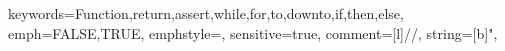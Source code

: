 {keywords={Function,return,assert,while,for,to,downto,if,then,else},%
emph={FALSE,TRUE},
emphstyle=\color{colconst},
sensitive=true,%
comment=[l]{//},%
string=[b]",%
}
